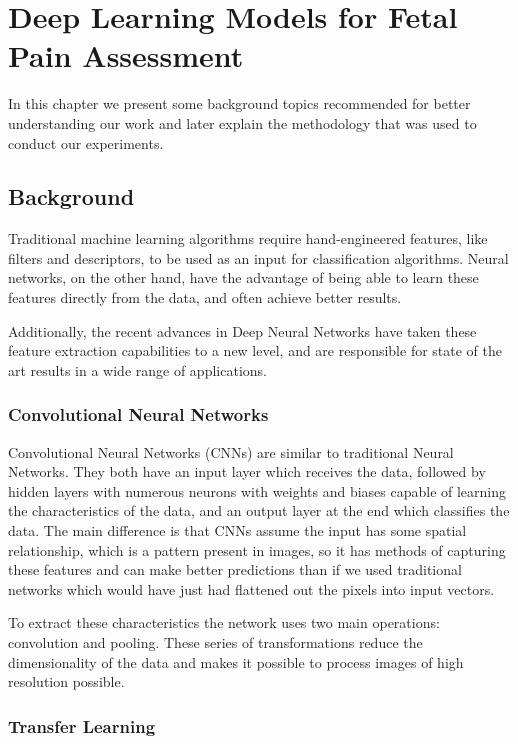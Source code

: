 \chapter{Deep Learning Models for Fetal Pain Assessment}

In this chapter we present some background topics recommended for better understanding our work and later explain the methodology that was used to conduct our experiments.

\section{Background}

Traditional machine learning algorithms require hand-engineered features, like filters and descriptors, to be used as an input for classification algorithms. Neural networks, on the other hand, have the advantage of being able to learn these features directly from the data, and often achieve better results. 

Additionally, the recent advances in Deep Neural Networks have taken these feature extraction capabilities to a new level, and are responsible for state of the art results in a wide range of applications.

\subsection{Convolutional Neural Networks}

Convolutional Neural Networks (CNNs) are similar to traditional Neural Networks. They both have an input layer which receives the data, followed by hidden layers with numerous neurons with weights and biases capable of learning the characteristics of the data, and an output layer at the end which classifies the data. The main difference is that CNNs assume the input has some spatial relationship, which is a pattern present in images, so it has methods of capturing these features and can make better predictions than if we used traditional networks which would have just had flattened out the pixels into input vectors.

To extract these characteristics the network uses two main operations: convolution and pooling. These series of transformations reduce the dimensionality of the data and makes it possible to process images of high resolution possible. 

\subsection{Transfer Learning}

